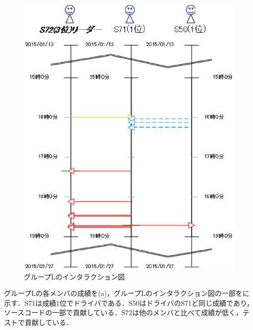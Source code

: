 \begin{figure}[h]
	\begin{center}
		\includegraphics[scale=0.75]{img/flowL2.eps}
		\caption{グループLのインタラクション図}
		\label{fig:flowL2}
	\end{center}
\end{figure}

グループLの各メンバの成績を(a)，グループLのインタラクション図の一部をに示す．S71は成績1位でドライバである．S50はドライバのS71ど同じ成績であり，ソースコードの一部で貢献している．S72は他のメンバと比べて成績が低く，テストで貢献している．


